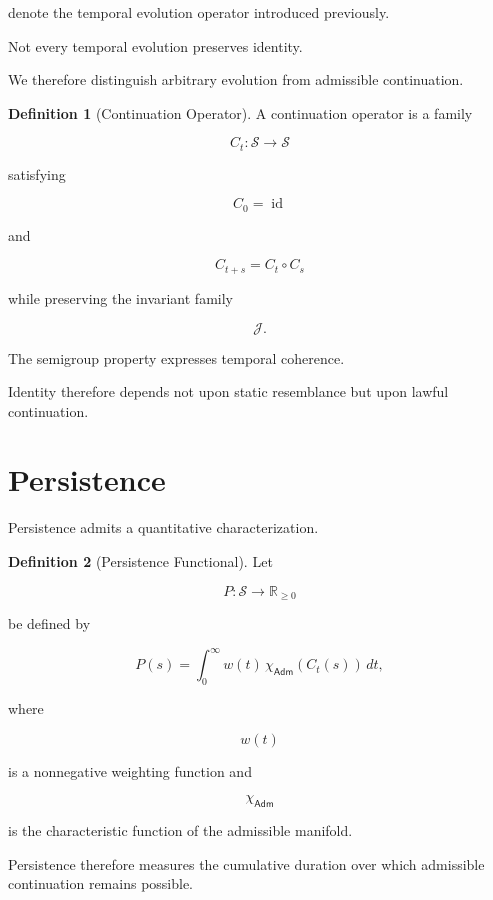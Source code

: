 \documentclass[11pt,oneside]{book}
\numberwithin{equation}{chapter}
\theoremstyle{definition}
\newtheorem{definition}{Definition}[chapter]
\theoremstyle{plain}
\begin{document}
denote the temporal evolution operator introduced previously.

Not every temporal evolution preserves identity.

We therefore distinguish arbitrary evolution from admissible continuation.

\begin{definition}[Continuation Operator]

A continuation operator is a family

\[
C_t:\mathcal{S}\rightarrow\mathcal{S}
\]

satisfying

\[
C_0=\operatorname{id}
\]

and

\[
C_{t+s}
=
C_t
\circ
C_s
\]

while preserving the invariant family

\[
\mathcal{J}.
\]

\end{definition}

The semigroup property expresses temporal coherence.

Identity therefore depends not upon static resemblance but upon lawful
continuation.

\section{Persistence}

Persistence admits a quantitative characterization.

\begin{definition}[Persistence Functional]

Let

\[
P:\mathcal{S}\rightarrow\mathbb{R}_{\ge0}
\]

be defined by

\[
P(s)
=
\int_0^\infty
w(t)
\,\chi_{\mathsf{Adm}}
(C_t(s))
\,dt,
\]

where

\[
w(t)
\]

is a nonnegative weighting function and

\[
\chi_{\mathsf{Adm}}
\]

is the characteristic function of the admissible manifold.

\end{definition}

Persistence therefore measures the cumulative duration over which admissible
continuation remains possible.
\end{document}
